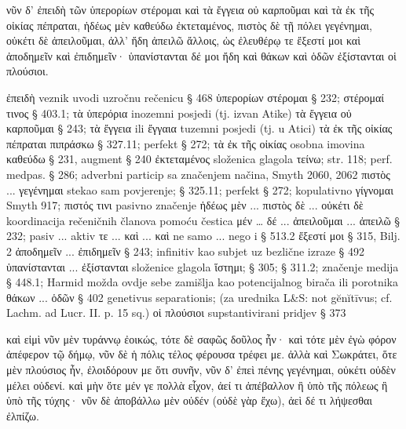 
{\large
\begin{greek}
\noindent νῦν δ' 
ἐπειδὴ τῶν ὑπερορίων στέρομαι 
καὶ τὰ ἔγγεια οὐ καρποῦμαι 
καὶ τὰ ἐκ τῆς οἰκίας πέπραται, 
ἡδέως μὲν καθεύδω ἐκτεταμένος, 
πιστὸς δὲ τῇ πόλει γεγένημαι, 
οὐκέτι δὲ ἀπειλοῦμαι, 
ἀλλ' ἤδη ἀπειλῶ ἄλλοις, 
ὡς ἐλευθέρῳ τε ἔξεστί μοι 
καὶ ἀποδημεῖν καὶ ἐπιδημεῖν· 
ὑπανίστανται δέ μοι ἤδη καὶ θάκων 
καὶ ὁδῶν ἐξίστανται οἱ πλούσιοι.

\end{greek}
}

\begin{description}[noitemsep]
ἐπειδὴ	veznik uvodi uzročnu rečenicu § 468
ὑπερορίων στέρομαι	§ 232; στέρομαί τινος § 403.1; τὰ ὑπερόρια inozemni posjedi (tj. izvan Atike)
τὰ ἔγγεια οὐ καρποῦμαι	§ 243; τὰ ἔγγεια ili ἔγγαια tuzemni posjedi (tj. u Atici)
τὰ ἐκ τῆς οἰκίας πέπραται	πιπράσκω § 327.11; perfekt § 272; τὰ ἐκ τῆς οἰκίας osobna imovina
καθεύδω	§ 231, augment § 240 
ἐκτεταμένος	složenica glagola τείνω; str. 118; perf. medpas. § 286; adverbni particip sa značenjem načina, Smyth 2060, 2062
πιστὸς ... γεγένημαι	stekao sam povjerenje; § 325.11; perfekt § 272; kopulativno γίγνομαι Smyth 917; πιστός τινι pasivno značenje
ἡδέως μὲν ... πιστὸς δὲ ... 
οὐκέτι δὲ	koordinacija rečeničnih članova pomoću čestica μέν … δέ ...
ἀπειλοῦμαι ... ἀπειλῶ	§ 232; pasiv ... aktiv
τε ... καὶ ... καὶ 	ne samo ... nego i § 513.2 
ἔξεστί μοι	§ 315, Bilj. 2
ἀποδημεῖν ... ἐπιδημεῖν	§ 243; infinitiv kao subjet uz bezlične izraze § 492
ὑπανίστανται ... ἐξίστανται 	složenice glagola ἵστημι; § 305; § 311.2; značenje medija § 448.1; Harmid možda ovdje sebe zamišlja kao potencijalnog birača ili porotnika
θάκων ... ὁδῶν	§ 402 genetivus separationis; (za urednika L&S: not gĕnĭtīvus; cf. Lachm. ad Lucr. II. p. 15 sq.)
οἱ πλούσιοι	supstantivirani pridjev § 373
\end{description}


{\large
\begin{greek}
\noindent καὶ εἰμὶ νῦν μὲν τυράννῳ ἐοικώς, 
τότε δὲ 
σαφῶς δοῦλος ἦν· 
καὶ τότε μὲν ἐγὼ 
φόρον ἀπέφερον τῷ δήμῳ, 
νῦν δὲ ἡ πόλις 
τέλος φέρουσα 
τρέφει με. 
ἀλλὰ καὶ Σωκράτει, 
ὅτε μὲν πλούσιος ἦν, 
ἐλοιδόρουν με 
ὅτι συνῆν, 
νῦν δ' 
ἐπεὶ πένης γεγένημαι, 
οὐκέτι οὐδὲν μέλει οὐδενί. 
καὶ μὴν 
ὅτε μέν γε πολλὰ εἶχον, 
ἀεί τι ἀπέβαλλον 
ἢ ὑπὸ τῆς πόλεως 
ἢ ὑπὸ τῆς τύχης· 
νῦν δὲ 
ἀποβάλλω μὲν οὐδέν 
(οὐδὲ γὰρ ἔχω), 
ἀεὶ δέ τι λήψεσθαι 
ἐλπίζω.

\end{greek}
}

